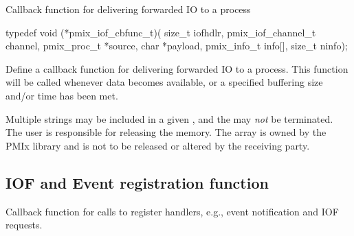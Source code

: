 \summary

Callback function for delivering forwarded \ac{IO} to a process

\format

\cspecificstart
\begin{codepar}
typedef void (*pmix_iof_cbfunc_t)(
                             size_t iofhdlr, pmix_iof_channel_t channel,
                             pmix_proc_t *source, char *payload,
                             pmix_info_t info[], size_t ninfo);
\end{codepar}
\cspecificend

\begin{arglist}
\end{arglist}

\descr

Define a callback function for delivering forwarded \ac{IO} to a process. This function will be called whenever data becomes available, or a
specified buffering size and/or time has been met.

\adviceuserstart
Multiple strings may be included in a given , and the  may \textit{not} be  terminated. The user is responsible for releasing the  memory. The  array is owned by the \ac{PMIx} library and is not to be released or altered by the receiving party.
\adviceuserend


\subsection{IOF and Event registration function}

\summary

Callback function for calls to register handlers, e.g., event notification and IOF requests.

\format

